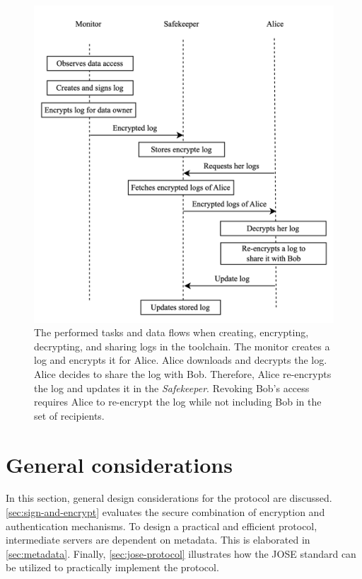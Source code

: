 \documentclass[../main.tex]{subfiles}
\begin{document}
\begin{figure}[h!]
    \includegraphics[width=12.7cm]{../img/05/overview.png}
    \centering
    \caption[Protocol overview]{
        The performed tasks and data flows when creating, encrypting, decrypting, and sharing logs in the toolchain.
        The monitor creates a log and encrypts it for Alice.
        Alice downloads and decrypts the log.
        Alice decides to share the log with Bob.
        Therefore, Alice re-encrypts the log and updates it in the \emph{Safekeeper}.
        Revoking Bob's access requires Alice to re-encrypt the log while not including Bob in the set of recipients.
    }
    \label{fig:protocol-overview}
\end{figure}

\section{General considerations}
\label{sec:protocol-considerations}
In this section, general design considerations for the protocol are discussed.
\cref{sec:sign-and-encrypt} evaluates the secure combination of encryption and authentication mechanisms.
To design a practical and efficient protocol, intermediate servers are dependent on metadata.
This is elaborated in \cref{sec:metadata}.
Finally, \cref{sec:jose-protocol} illustrates how the JOSE standard can be utilized to practically implement the protocol.
\end{document}
